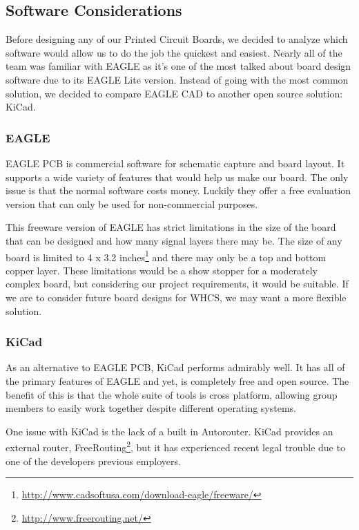 
\subsection{Software Considerations}
Before designing any of our Printed Circuit Boards, we decided to analyze which
software would allow us to do the job the quickest and easiest. Nearly all of
the team was familiar with EAGLE as it's one of the most talked about board
design software due to its EAGLE Lite version. Instead of going with the most
common solution, we decided to compare EAGLE CAD to another open source
solution: KiCad.

\subsubsection{EAGLE}
EAGLE PCB is commercial software for schematic capture and board layout. It
supports a wide variety of features that would help us make our board. The only
issue is that the normal software costs money. Luckily they offer a free
evaluation version that can only be used for non-commercial purposes.

This freeware version of EAGLE has strict limitations in the size of the board
that can be designed and how many signal layers there may be. The size of any
board is limited to 4 x 3.2
inches\footnote{\url{http://www.cadsoftusa.com/download-eagle/freeware/}} and
there may only be a top and bottom copper layer. These limitations would be a
show stopper for a moderately complex board, but considering our project
requirements, it would be suitable.  If we are to consider future board designs
for WHCS, we may want a more flexible solution.

\subsubsection{KiCad}
As an alternative to EAGLE PCB, KiCad performs admirably well. It has all of
the primary features of EAGLE and yet, is completely free and open source. The benefit of this is that the whole suite of tools is cross platform, allowing group members to easily work together despite different operating systems.

One issue with KiCad is the lack of a built in Autorouter. KiCad provides an external router, FreeRouting\footnote{\url{http://www.freerouting.net/}}, but it has experienced recent legal trouble due to one of the developers previous employers.

